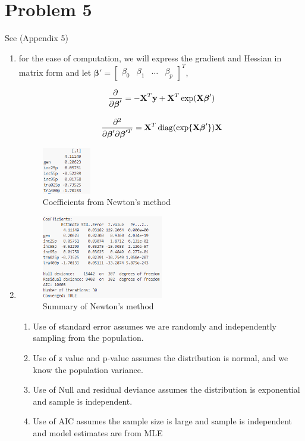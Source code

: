 \documentclass{article}
\newcommand{\vect}[1]{\boldsymbol{#1}}
\newcommand{\vectrm}[1]{\boldsymbol{\rm #1}}
\DeclareMathOperator{\diag}{diag}
\begin{document}
\newpage
\section*{Problem 5}
See (Appendix 5)
\begin{enumerate}[label=(\alph*)]
  \item for the ease of computation, we will express the gradient and Hessian in matrix form and let \(\vect \beta' = \begin{bmatrix}
      \beta_0 & \beta_1 & \ldots & \beta_p
  \end{bmatrix}^T\),

\[\frac{\partial}{\partial \vect \beta'} = -\vectrm X^T \vectrm y
+ \vectrm X^T \exp(\vectrm X \vect \beta')
\]

\[\frac{\partial^2}{\partial \vect \beta' \partial \vect \beta'^T} = \vectrm X^T \diag(\exp \{\vectrm X \vect \beta'\}) \vectrm X\]
\begin{figure}[h]
    \centering
    \includegraphics[width=0.2\textwidth]{5a.png}
    \caption{Coefficients from Newton's method}
\end{figure}
\item
\begin{figure}[h]
    \centering
    \includegraphics[width=0.5\textwidth]{5b.png}
    \caption{Summary of Newton's method}
\end{figure}

\begin{enumerate}
    \item Use of standard error assumes we are randomly and independently sampling from the population.
    \item Use of z value and p-value assumes the distribution is normal, and we know the population variance.
    \item Use of Null and residual deviance assumes the distribution is exponential and sample is independent. 
    \cite{npm}
    \item Use of AIC assumes the sample size is large and sample is independent and model estimates are from MLE
\end{enumerate}

\end{enumerate}
\end{document}
